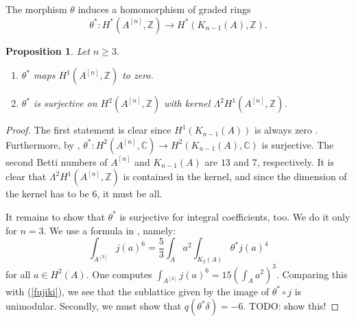 \documentclass{amsart}
\newcommand{\hilb}[1]{^{[#1]}}
\newcommand{\kum}[2]{K_{ #2 }( #1 )}
\newcommand{\C}{\mathbb{C}}
\newcommand{\Z}{\mathbb{Z}}
\theoremstyle{plain}
\newtheorem{proposition}[theorem]{Proposition}
\theoremstyle{definition}
\theoremstyle{remark}
\begin{document}
The morphism $\theta$ induces a homomorphism of graded rings
\begin{equation}
\theta^* :H^*(A\hilb{n},\Z)\longrightarrow H^*(\kum{A}{n-1},\Z).
\end{equation}

\begin{proposition}Let $n\geq 3$.
\begin{enumerate} 
 \item $\theta^*$ maps $H^1(A\hilb{n},\Z)$ to zero.
 \item $\theta^*$ is surjective on $H^2(A\hilb{n},\Z)$ with kernel $\Lambda^2H^1(A\hilb{n},\Z)$.
\end{enumerate}
\end{proposition}
\begin{proof}
The first statement is clear since $H^1(\kum{A}{n-1})$ is always zero \cite[Thm.~3]{Beauville}. Furthermore, by \cite[Sect.~7]{Beauville}, $\theta^{\ast} : H^2(A\hilb{n},\C) \rightarrow H^2(\kum{A}{n-1},\C)$ is surjective. The second Betti numbers of $A\hilb{n}$ and $\kum{A}{n-1}$ are $13$ and $7$, respectively. It is clear that $\Lambda^2H^1(A\hilb{n},\Z)$ is contained in the kernel, and since the dimension of the kernel has to be $6$, it must be all.

It remains to show that $\theta^*$  is surjective for integral coefficients, too. We do it only for $n=3$. We use a formula in \cite[p. 8]{Britze}, namely:
\begin{equation} \int_{A\hilb{3}}j(a)^6 = \frac{5}{3} \int_A a^2 \int_{\kum{A}{2}} \theta^* j(a)^4
\end{equation}
for all $a\in H^2(A)$. One computes $\int_{A\hilb{3}}j(a)^6 = 15 \left(\int_A a^2\right)^3$. Comparing this with (\ref{fujiki}), we see that the sublattice given by the image of $\theta^*\circ j$ is unimodular. Secondly, we must show that $q(\theta^*\delta) = -6$. TODO: show this!
\end{proof}
\end{document}
